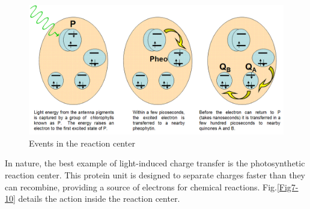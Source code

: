 \begin{figure}[h]
	\centering
	\includegraphics[width=\textwidth]{./figures/Topic7/Fig7-11.png}
	\caption{Events in the reaction center}
	\label{Fig7-11}
\end{figure}
In nature, the best example of light-induced charge transfer is the photosynthetic reaction center.  This protein unit is designed to separate charges faster than they can recombine, providing a source of electrons for chemical reactions.  Fig.\ref{Fig7-10} details the action inside the reaction center.      